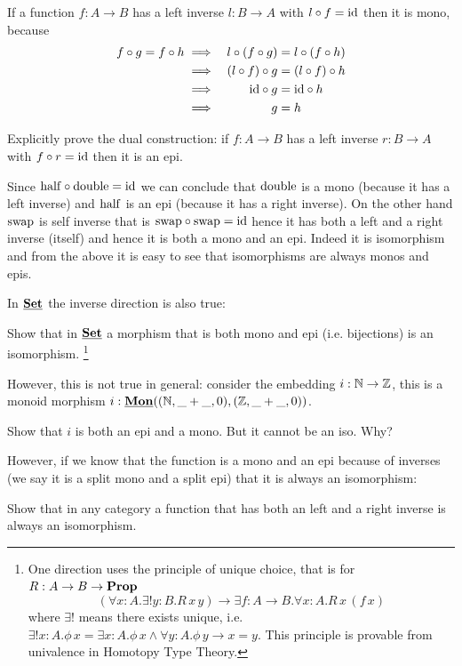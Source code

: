 If a function $f : A \to B$ has a left inverse $l : B \to A$ with $l \circ f = \mathrm{id}$ then it is mono, because  
\begin{align*}
f \circ g = f \circ h 
& \implies & l \circ (f \circ g) & = l \circ (f \circ h) \\
& \implies & (l \circ f) \circ g& = (l \circ f) \circ h \\
& \implies &\mathrm{id} \circ g & = \mathrm{id} \circ h \\
& \implies & g & = h 
\end{align*}
\begin{Exercise}
  Explicitly prove the dual construction: if $f : A \to B$ has a left inverse $r : B \to A$ with $f \circ r = \mathrm{id}$ then it is an epi.
\end{Exercise}
Since $\mathrm{half} \circ \mathrm{double} = \mathrm{id}$ we can conclude that $\mathrm{double}$ is a mono (because it has a left inverse) and $\mathrm{half}$ is an epi (because it has a right inverse). On the other hand $\mathrm{swap}$ is self inverse that is $\mathrm{swap} \circ \mathrm{swap} = \mathrm{id}$ hence it has both a left and a right inverse (itself) and hence it is both a mono and an epi. 
 Indeed it is isomorphism and from the above it is easy to see that isomorphisms are always monos and epis. 

In $\underline{\mathbf{\mathbf{Set}}}$ the inverse direction is also true: 
\begin{Exercise}
  Show that in $\underline{\mathbf{\mathbf{Set}}}$ a morphism that is both mono and epi (i.e. bijections) is an isomorphism.
\footnote{One direction uses the principle of unique choice, that is for $R : A \to B \to \mathbf{Prop}$~
\[(\forall x:A.\exists! y:B .R\,x\,y) \to \exists f :A \to B . \forall x:A.R\,x\,(f\,x) \]
where $\exists!$ means there exists unique, i.e. $\exists! x:A.\phi\,x = \exists x:A.\phi\,x \wedge \forall y:A.\phi\,y \to x=y$. This principle is provable from univalence in Homotopy Type Theory.} 
\end{Exercise}
However, this is not true in general: consider the embedding $i : \mathbb{N} \to \mathbb{Z}$, this is a monoid morphism $i : \underline{\mathbf{Mon}}((\mathbb{N},\_+\_,0),(\mathbb{Z},\_+\_,0))$. 
\begin{Exercise}
  Show that $i$ is both an epi and a mono. But it cannot be an iso. Why?
\end{Exercise}
However, if we know that the function is a mono and an epi because of inverses (we say it is a split mono and a split epi) that it is always an isomorphism:
\begin{Exercise}
  Show that in any category a function that has both an left and a right inverse is always an isomorphism.
\end{Exercise}


